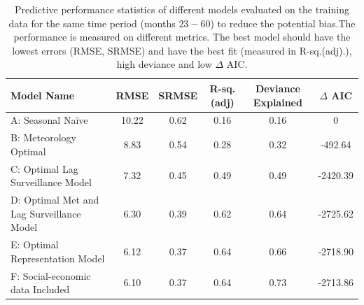 \documentclass{bmcart}
\begin{document}
\begin{table}[h!]
	\centering
	\begin{tabular}{|lccccc|}
		\hline
		\textbf{Model Name} & \textbf{RMSE} & \textbf{SRMSE} & \textbf{R-sq.(adj)} & \textbf{Deviance Explained} & \textbf{$\Delta$ AIC} \\ 
		\hline
		A: Seasonal Na\"{i}ve  & 10.22 & 0.62 & 0.16 & 0.16 & 0\\ 
		B: Meteorology Optimal & 8.83 & 0.54 & 0.28 & 0.32 & -492.64\\ 
		C: Optimal Lag Surveillance Model  &  7.32 & 0.45 & 0.49 & 0.49 & -2420.39 \\ 
		D: Optimal Met and Lag Surveillance Model  & 6.30 & 0.39 & 0.62 & 0.64 &  -2725.62\\ 
		E: Optimal Representation Model & 6.12 & 0.37 & 0.64 & 0.66 & -2718.90\\ 
		F: Social-economic data Included & 6.10 & 0.37 & 0.64 & 0.73 & -2713.86 \\ 
		\hline
	\end{tabular}
	\caption{Predictive performance statistics of different models evaluated on the training data for the same time period  (months $23-60$) to reduce the potential bias.The performance is measured on different metrics. The best model should have the lowest errors (RMSE, SRMSE) and have the best fit (measured in R-sq.(adj).), high deviance and low $\Delta$ AIC.}
	\label{resultsPrediction}
\end{table}











\end{document}
